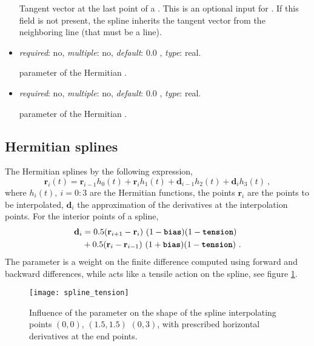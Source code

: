 \begin{itemize}
    Tangent vector at the last point of a . 
    This is an optional input for . If this field is 
    not present, the spline inherits the tangent vector from the 
    neighboring line (that must be a  line).

\item {} \textit{required}: no, \textit{multiple}: no, 
\textit{default}: 0.0 , \textit{type}: real.

     parameter of the Hermitian .

\item {} \textit{required}: no, \textit{multiple}: no, 
\textit{default}: 0.0 , \textit{type}: real.

     parameter of the Hermitian .

\end{itemize}

\subsection{Hermitian splines}
The Hermitian splines by the following expression,
\begin{equation}
\mathbf{r}_i(t) = \mathbf{r}_{i-1} h_0(t) + \mathbf{r}_{i} h_1(t) +
                  \mathbf{d}_{i-1} h_2(t) + \mathbf{d}_{i} h_3(t) \ ,
\end{equation}
where $h_i(t), \ i=0:3$ are the Hermitian functions, 
the points $\mathbf{r}_i$ are the points to be interpolated, 
$\mathbf{d}_i$ the approximation of the derivatives at the interpolation 
points. For the interior points of a spline,
\begin{equation}
\begin{aligned}
\mathbf{d}_i & = 0.5 ( \mathbf{r}_{i+1} - \mathbf{r}_{i  } ) \ 
                      (1-\param{bias}) (1-\param{tension}) \\
             & + 0.5 ( \mathbf{r}_{i  } - \mathbf{r}_{i-1} ) \ 
                    (1+\param{bias}) (1-\param{tension}) \ .
\end{aligned}
\end{equation}
The  parameter is a weight on the finite difference 
computed using forward and backward differences, while  
acts like a tensile action on the spline, see figure \ref{fig:spline_tension}.
\begin{figure}[h!]
\centering
\texttt{[image: spline\_tension]}
    \caption{Influence of the  parameter on the shape of 
    the spline interpolating points $(0,0)$, $(1.5,1.5)$ $(0,3)$, with 
    prescribed horizontal derivatives at the end points.}
\label{fig:spline_tension}
\end{figure}


